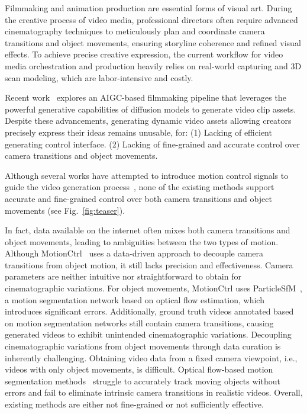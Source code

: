 \documentclass{article} %
\begin{document}
\vspace{-2mm}
Filmmaking and animation production are essential forms of visual art.
During the creative process of video media, professional directors often require advanced cinematography techniques to meticulously plan and coordinate camera transitions and object movements, ensuring storyline coherence and refined visual effects. 
To achieve precise creative expression, the current workflow for video media orchestration and production heavily relies on real-world capturing and 3D scan modeling, which are labor-intensive and costly.


Recent work~\citep{ho2022imagen, blattmann2023align, girdhar2023emu, xing2023dynamicrafter, chen2023videocrafter1, blattmann2023stable, bar2024lumiere, videoworldsimulators2024} explores an AIGC-based filmmaking pipeline that leverages the powerful generative capabilities of diffusion models to  generate video clip assets.
Despite these advancements, generating dynamic video assets allowing   creators precisely  express  their ideas remains unusable, for:
(1) Lacking of efficient  generating control interface.
(2) Lacking of fine-grained and accurate control over camera transitions and object movements.


Although several works have attempted to introduce motion control signals to guide the video generation process~\citep{yin2023dragnuwa, wang2023motionctrl, wang2024boximator, wu2024draganything}, none of the existing methods support accurate and fine-grained control over both camera transitions and object movements (see Fig.~\ref{fig:teaser}).


In fact, data available on the internet often mixes both camera transitions and object movements, leading to ambiguities between the two types of motion. Although MotionCtrl~\citep{wang2023motionctrl} uses a data-driven approach to decouple camera transitions from object motion, it still lacks precision and effectiveness. Camera parameters are neither intuitive nor straightforward to obtain for cinematographic variations. For object movements, MotionCtrl uses ParticleSfM~\citep{zhao2022particlesfm}, a motion segmentation network based on optical flow estimation, which introduces significant errors. Additionally, ground truth videos annotated based on motion segmentation networks still contain camera transitions, causing generated videos to exhibit unintended cinematographic variations.
Decoupling cinematographic variations from object movements through data curation is inherently challenging. Obtaining video data from a fixed camera viewpoint, i.e., videos with only object movements, is difficult. Optical flow-based motion segmentation methods~\citep{teed2020raft, xu2022gmflow, zhao2022particlesfm, yin2023dragnuwa, wang2023motionctrl} struggle to accurately track moving objects without errors and fail to eliminate intrinsic camera transitions in realistic videos. Overall, existing methods are either not fine-grained or not sufficiently effective.
\end{document}
